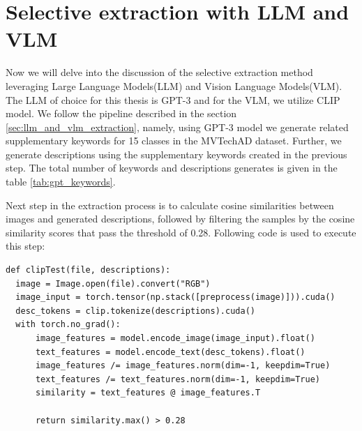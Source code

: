 \section{Selective extraction with LLM and VLM}
Now we will delve into the discussion of the selective extraction method leveraging Large Language Models(LLM)\cite{llm_survey} and Vision Language Models(VLM)\cite{vlm_survey}. The LLM of choice for this thesis is GPT-3\cite{gpt3} and for the VLM, we utilize CLIP\cite{clip} model. We follow the pipeline described in the section \ref{sec:llm_and_vlm_extraction}, namely, using GPT-3 model we generate related supplementary keywords for 15 classes in the MVTechAD\cite{mvtecad} dataset. Further, we generate descriptions using the supplementary keywords created in the previous step. The total number of keywords and descriptions generates is given in the table \ref{tab:gpt_keywords}.

Next step in the extraction process is to calculate cosine similarities between images and generated descriptions, followed by filtering the samples by the cosine similarity scores that pass the threshold of 0.28. Following code is used to execute this step:

\begin{lstlisting}
def clipTest(file, descriptions):
  image = Image.open(file).convert("RGB")
  image_input = torch.tensor(np.stack([preprocess(image)])).cuda()
  desc_tokens = clip.tokenize(descriptions).cuda()
  with torch.no_grad():
      image_features = model.encode_image(image_input).float()
      text_features = model.encode_text(desc_tokens).float()
      image_features /= image_features.norm(dim=-1, keepdim=True)
      text_features /= text_features.norm(dim=-1, keepdim=True)
      similarity = text_features @ image_features.T

      return similarity.max() > 0.28
\end{lstlisting}

